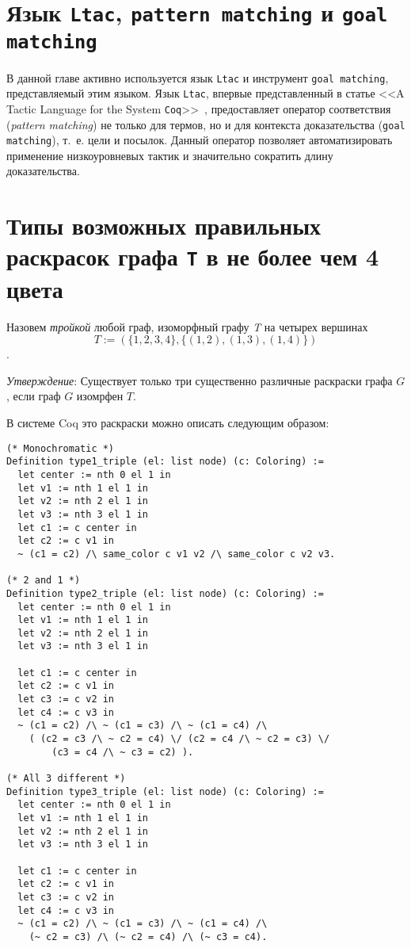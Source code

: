 \section{Язык {\tt Ltac}, {\tt pattern matching} и {\tt goal matching} }
В данной главе активно используется язык {\tt Ltac} и инструмент {\tt goal matching}, представляемый этим языком.
Язык {\tt Ltac}, впервые представленный в статье <<A Tactic Language for the System {\tt Coq}>>~\cite{Del00}, предоставляет оператор соответствия ({\it pattern matching}) не только для термов, но и для контекста доказательства ({\tt goal matching}), т.~е. цели и посылок. Данный оператор позволяет автоматизировать применение низкоуровневых тактик и значительно сократить длину доказательства.

\section{Типы возможных правильных раскрасок графа {\tt T} в не более чем 4 цвета}

Назовем {\it тройкой} любой граф, изоморфный графу {\it T} на четырех вершинах $$T := (\{1, 2, 3, 4\} , \{(1, 2), (1, 3), (1, 4) \} )$$.

{\it Утверждение}: Существует только три существенно различные раскраски графа $G$, если граф $G$ изомрфен $T$.

В системе Coq это раскраски можно описать следующим образом:

\begin{verbatim}
(* Monochromatic *)
Definition type1_triple (el: list node) (c: Coloring) :=
  let center := nth 0 el 1 in
  let v1 := nth 1 el 1 in
  let v2 := nth 2 el 1 in
  let v3 := nth 3 el 1 in
  let c1 := c center in
  let c2 := c v1 in
  ~ (c1 = c2) /\ same_color c v1 v2 /\ same_color c v2 v3.

(* 2 and 1 *)
Definition type2_triple (el: list node) (c: Coloring) :=
  let center := nth 0 el 1 in
  let v1 := nth 1 el 1 in
  let v2 := nth 2 el 1 in
  let v3 := nth 3 el 1 in

  let c1 := c center in
  let c2 := c v1 in
  let c3 := c v2 in 
  let c4 := c v3 in
  ~ (c1 = c2) /\ ~ (c1 = c3) /\ ~ (c1 = c4) /\
    ( (c2 = c3 /\ ~ c2 = c4) \/ (c2 = c4 /\ ~ c2 = c3) \/ 
        (c3 = c4 /\ ~ c3 = c2) ).

(* All 3 different *)
Definition type3_triple (el: list node) (c: Coloring) :=
  let center := nth 0 el 1 in
  let v1 := nth 1 el 1 in
  let v2 := nth 2 el 1 in
  let v3 := nth 3 el 1 in

  let c1 := c center in
  let c2 := c v1 in
  let c3 := c v2 in 
  let c4 := c v3 in
  ~ (c1 = c2) /\ ~ (c1 = c3) /\ ~ (c1 = c4) /\
    (~ c2 = c3) /\ (~ c2 = c4) /\ (~ c3 = c4).
\end{verbatim}

